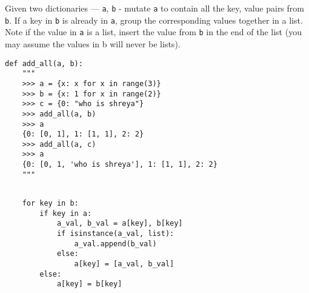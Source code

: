\question Given two dictionaries —
\texttt{a}, \texttt{b} - mutate \texttt{a} to contain all the key, value pairs from \texttt{b}. If a key in \texttt{b} is already in \texttt{a}, group the corresponding values together in a list. Note if the value in \texttt{a} is a list, insert the value from \texttt{b} in the end of the list (you may assume the values in b will never be lists).

\begin{lstlisting}
def add_all(a, b):
    """
    >>> a = {x: x for x in range(3)}
    >>> b = {x: 1 for x in range(2)}
    >>> c = {0: "who is shreya"}
    >>> add_all(a, b)
    >>> a
    {0: [0, 1], 1: [1, 1], 2: 2}
    >>> add_all(a, c)
    >>> a
    {0: [0, 1, 'who is shreya'], 1: [1, 1], 2: 2}
    """
    
\end{lstlisting}
\begin{solution}[1.8in]
\begin{lstlisting}
    for key in b:
        if key in a:
            a_val, b_val = a[key], b[key]
            if isinstance(a_val, list):
                a_val.append(b_val)
            else:
                a[key] = [a_val, b_val]
        else:
            a[key] = b[key]
\end{lstlisting}
\end{solution}
